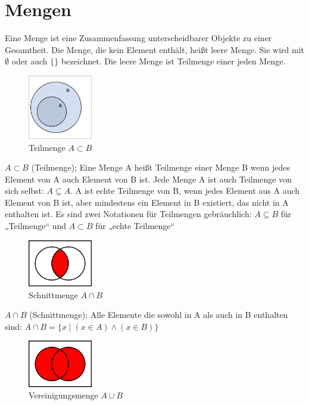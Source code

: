 \documentclass[a4paper]{article}
\begin{document}
\section{Mengen}
Eine Menge ist eine Zusammenfassung unterscheidbarer Objekte zu einer Gesamtheit. Die Menge, die kein Element enthält, heißt leere Menge. Sie wird mit $\emptyset$ oder auch $\{\}$ bezeichnet. Die leere Menge ist Teilmenge einer jeden Menge.
\begin{figure}[H]
\centering
\includegraphics[width=0.25\textwidth]{images/teilmenge.png}
\caption{\label{fig:teilmenge}Teilmenge $A \subset B$}
\end{figure}
$A \subset B$ (Teilmenge); Eine Menge A heißt Teilmenge einer Menge B wenn jedes Element von A auch Element von B ist. Jede Menge A ist auch Teilmenge von sich selbst: $A \subseteq A $. A ist echte Teilmenge von B, wenn jedes Element aus A auch Element von B ist, aber mindestens ein Element in B existiert, das nicht in A enthalten ist. Es sind zwei Notationen für Teilmengen gebräuchlich: $A \subseteq B$ für „Teilmenge“ und $A \subset B$ für „echte Teilmenge“ 
\begin{figure}[H]
\centering
\includegraphics[width=0.25\textwidth]{images/schnittmenge.png}
\caption{\label{fig:schnittmenge}Schnittmenge $A \cap B$}
\end{figure} 
$A \cap B$ (Schnittmenge); Alle Elemente die sowohl in A als auch in B enthalten sind: $A \cap B = \{ x \mid (x \in A) \land (x \in B)\} $
\begin{figure}[H]
\centering
\includegraphics[width=0.25\textwidth]{images/vereinigungsmenge.png}
\caption{\label{fig:vereinigungsmenge}Vereinigungsmenge $A \cup B$}
\end{figure}
\end{document}
